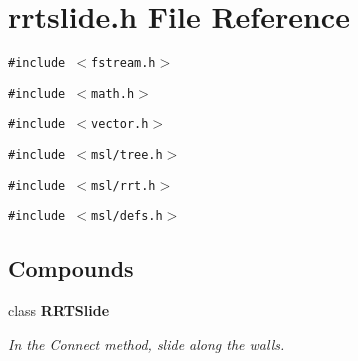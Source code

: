 \section{rrtslide.h File Reference}
\label{rrtslide_8h}
{\tt \#include $<$fstream.h$>$}\par
{\tt \#include $<$math.h$>$}\par
{\tt \#include $<$vector.h$>$}\par
{\tt \#include $<$msl/tree.h$>$}\par
{\tt \#include $<$msl/rrt.h$>$}\par
{\tt \#include $<$msl/defs.h$>$}\par
\subsection*{Compounds}
\begin{CompactItemize}
\item 
class {\bf RRTSlide}
\begin{CompactList}\small\item\em In the Connect method, slide along the walls.\item\end{CompactList}\end{CompactItemize}
